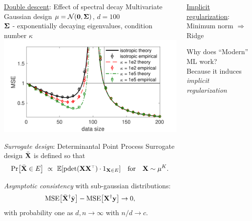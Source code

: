 \documentclass{beamer}
\begin{document}
\begin{frame}
\begin{columns}
\begin{column}{.32\textwidth}
\begin{block}{\underline{Double descent}: Effect of spectral decay}
Multivariate Gaussian design
 $\mu=\mathcal{N}(\mathbf 0,\mathbf{\Sigma})$, $d=100$\\[1mm]
 $\mathbf{\Sigma}$ - exponentially decaying eigenvalues, condition number
 $\kappa$\\[3mm]
 
\includegraphics[width=\textwidth]{figs/descent-intro-nice}
\end{block}


\begin{block}{\emph{Surrogate design}: Determinantal Point Process}
Surrogate design ${\bar{\mathbf X}}$ is defined so that
\begin{align*}
  \Pr\big[\Xb\in E\big]\  \propto\ \E[\pdet(\X\X^\top)\cdot 1_{\X\in E}]
  \quad\text{for}\quad\X\sim\mu^K.
\end{align*}
\vspace{-1mm}

\textit{Asymptotic consistency} with sub-gaussian distributions:
\begin{align*}
{\mathrm{MSE}\big[{\bar{\mathbf X}}^\dagger\bar{\mathbf y}\big]} - {\mathrm{MSE}\big[\mathbf X^\dagger\mathbf y\big]} \rightarrow 0,
\end{align*}
with probability one as $d,n\rightarrow \infty$ with $n/d\rightarrow c$.
\end{block}

\end{column}

\begin{column}{0.32\textwidth}

\begin{block}{\underline{Implicit regularization}: Minimum norm
    $\Rightarrow$ Ridge }
  
Why does ``Modern'' ML work?\\
Because it induces \textit{implicit regularization}


\end{block}
\end{column}
\end{columns}
\end{frame}
\end{document}
